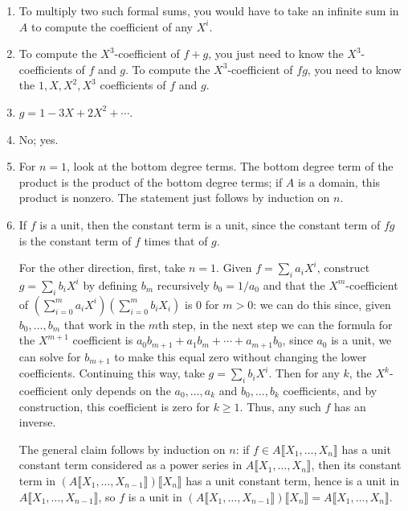 \documentclass[12pt]{amsart}
\newcommand{\Bold}[1]{\contour{black}{#1}}
\newcommand{\solution}[1]{\ifthenelse {\equal{\displaysol}{1}} {\begin{framed}{\color{meretale}\noindent #1}\end{framed}} { \ }}
\newcommand\itema{\stepcounter{enumii}\item[{\Bold{(\theenumii)}}]}
\begin{document}
\begin{enumerate}
\begin{samepage}
\begin{enumerate}
\end{enumerate}
\end{samepage}

\solution{
\begin{enumerate}
\itema To multiply two such formal sums, you would have to take an infinite sum in $A$ to compute the coefficient of any $X^i$.
\itema To compute the $X^3$-coefficient of $f+g$, you just need to know the $X^3$-coefficients of $f$ and $g$. To compute the $X^3$-coefficient of $fg$, you need to know the $1, X, X^2, X^3$ coefficients of $f$ and $g$.
\itema $g= 1 - 3X + 2X^2 + \cdots$.
\itema No; yes.
\itema For $n=1$, look at the bottom degree terms. The bottom degree term of the product is the product of the bottom degree terms; if $A$ is a domain, this product is nonzero. The statement just follows by induction on $n$.
\itema If $f$ is a unit, then the constant term is a unit, since the constant term of $fg$ is the constant term of $f$ times that of $g$. 

For the other direction, first, take $n=1$.  Given $f=\sum_i a_i X^i$, construct $g=\sum_i b_i X^i$ by defining $b_m$ recursively $b_0=1/a_0$ and that the $X^m$-coefficient of $(\sum_{i=0}^m a_i X^i)(\sum_{i=0}^m b_i X_i)$ is $0$ for $m>0$: we can do this since, given $b_0,\dots,b_m$ that work in the $m$th step, in the next step we can the formula for the $X^{m+1}$ coefficient is $a_0 b_{m+1} + a_1 b_m + \cdots + a_{m+1} b_0$, since $a_0$ is a unit, we can solve for $b_{m+1}$ to make this equal zero without changing the lower coefficients. Continuing this way, take $g= \sum_i b_i X^i$. Then  for any $k$, the $X^k$-coefficient only depends on the $a_0,\dots,a_k$ and $b_0,\dots,b_k$ coefficients, and by construction, this coefficient is zero for $k\geq 1$. Thus, any such $f$ has an inverse.

The general claim follows by induction on $n$: if $f\in A\llbracket X_1,\dots,X_n \rrbracket$ has a unit constant term considered as a power series in $A\llbracket X_1,\dots,X_n \rrbracket$, then its constant term in  $(A\llbracket X_1,\dots,X_{n-1} \rrbracket) \llbracket X_n \rrbracket$ has a unit constant term, hence is a unit in $A\llbracket X_1,\dots,X_{n-1} \rrbracket$, so $f$ is a unit in $(A\llbracket X_1,\dots,X_{n-1} \rrbracket) \llbracket X_n \rrbracket = A\llbracket X_1,\dots,X_n \rrbracket$.
\end{enumerate}
}





\end{enumerate}
\end{document}
